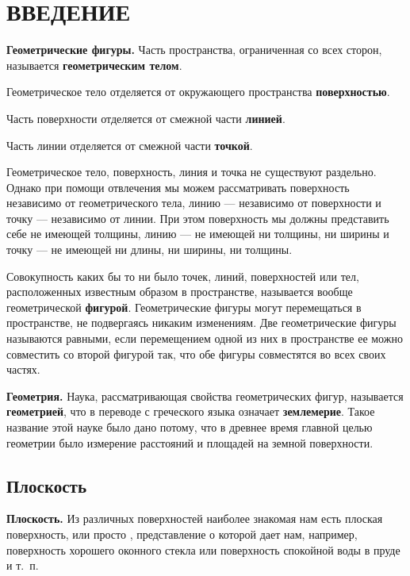 \documentclass[oneside]{book}
\begin{document}
\section*{ВВЕДЕНИЕ}

\textbf{Геометрические фигуры.}
Часть пространства, ограниченная со всех сторон, называется \textbf{геометрическим телом}.

Геометрическое тело отделяется от окружающего пространства \textbf{поверхностью}.

Часть поверхности отделяется от смежной части \textbf{линией}.

Часть линии отделяется от смежной части \textbf{точкой}.

Геометрическое тело, поверхность, линия и точка не существуют раздельно.
Однако при помощи отвлечения мы можем рассматривать поверхность независимо от геометрического тела, линию — независимо от поверхности и точку — независимо от линии.
При этом поверхность мы должны представить себе не имеющей толщины, линию — не имеющей ни толщины, ни ширины и точку — не имеющей ни длины, ни ширины, ни толщины.

Совокупность каких бы то ни было точек, линий, поверхностей или тел, расположенных известным образом в пространстве, называется вообще геометрической \textbf{фигурой}.
Геометрические фигуры могут перемещаться в пространстве, не подвергаясь никаким изменениям.
Две геометрические фигуры называются равными, если перемещением одной из них в пространстве ее можно совместить со второй фигурой так, что обе фигуры совместятся во всех своих частях.

\textbf{Геометрия.}
Наука, рассматривающая свойства геометрических фигур, называется \textbf{геометрией}, что в переводе с греческого языка означает \textbf{землемерие}.
Такое название этой науке было дано потому, что в древнее время главной целью геометрии было измерение расстояний и площадей на земной поверхности. %


\subsection*{Плоскость}

\textbf{Плоскость.}
Из различных поверхностей наиболее знакомая нам есть плоская поверхность, или просто , представление о которой дает нам, например, поверхность хорошего оконного стекла или поверхность спокойной воды в пруде и т.~п.
\end{document}
